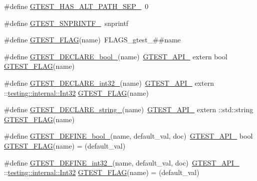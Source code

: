 \begin{DoxyCompactItemize}
\#define \hyperlink{fused-src_2gtest_2gtest_8h_acf0ee1851e6d342237bb64806ee1fd27}{G\-T\-E\-S\-T\-\_\-\-H\-A\-S\-\_\-\-A\-L\-T\-\_\-\-P\-A\-T\-H\-\_\-\-S\-E\-P\-\_\-}~0
\item 
\#define \hyperlink{fused-src_2gtest_2gtest_8h_aed1cc8143222d7a845a1269448ec203e}{G\-T\-E\-S\-T\-\_\-\-S\-N\-P\-R\-I\-N\-T\-F\-\_\-}~snprintf
\item 
\#define \hyperlink{fused-src_2gtest_2gtest_8h_a828f4e34a1c4b510da50ec1563e3562a}{G\-T\-E\-S\-T\-\_\-\-F\-L\-A\-G}(name)~F\-L\-A\-G\-S\-\_\-gtest\-\_\-\#\#name
\item 
\#define \hyperlink{fused-src_2gtest_2gtest_8h_a14eb0e9c6e0df765d1fbfd2db6966d14}{G\-T\-E\-S\-T\-\_\-\-D\-E\-C\-L\-A\-R\-E\-\_\-bool\-\_\-}(name)~\hyperlink{gtest-port_8h_aa73be6f0ba4a7456180a94904ce17790}{G\-T\-E\-S\-T\-\_\-\-A\-P\-I\-\_\-} extern bool \hyperlink{gtest__output__test___8cc_a448e05d56107d7550bea141e0f7a73d3}{G\-T\-E\-S\-T\-\_\-\-F\-L\-A\-G}(name)
\item 
\#define \hyperlink{fused-src_2gtest_2gtest_8h_aab2ee98cb616054b1d3a7dc71efe81fc}{G\-T\-E\-S\-T\-\_\-\-D\-E\-C\-L\-A\-R\-E\-\_\-int32\-\_\-}(name)~\hyperlink{gtest-port_8h_aa73be6f0ba4a7456180a94904ce17790}{G\-T\-E\-S\-T\-\_\-\-A\-P\-I\-\_\-} extern \-::\hyperlink{namespacetesting_1_1internal_af89e21e4043b5cf0c120af487b24fa06}{testing\-::internal\-::\-Int32} \hyperlink{gtest__output__test___8cc_a448e05d56107d7550bea141e0f7a73d3}{G\-T\-E\-S\-T\-\_\-\-F\-L\-A\-G}(name)
\item 
\#define \hyperlink{fused-src_2gtest_2gtest_8h_a9f74eee05f7ee5534139a622fe7da7dd}{G\-T\-E\-S\-T\-\_\-\-D\-E\-C\-L\-A\-R\-E\-\_\-string\-\_\-}(name)~\hyperlink{gtest-port_8h_aa73be6f0ba4a7456180a94904ce17790}{G\-T\-E\-S\-T\-\_\-\-A\-P\-I\-\_\-} extern \-::std\-::string \hyperlink{gtest__output__test___8cc_a448e05d56107d7550bea141e0f7a73d3}{G\-T\-E\-S\-T\-\_\-\-F\-L\-A\-G}(name)
\item 
\#define \hyperlink{fused-src_2gtest_2gtest_8h_a48e05814779e5a2f432b06a12618a760}{G\-T\-E\-S\-T\-\_\-\-D\-E\-F\-I\-N\-E\-\_\-bool\-\_\-}(name, default\-\_\-val, doc)~\hyperlink{gtest-port_8h_aa73be6f0ba4a7456180a94904ce17790}{G\-T\-E\-S\-T\-\_\-\-A\-P\-I\-\_\-} bool \hyperlink{gtest__output__test___8cc_a448e05d56107d7550bea141e0f7a73d3}{G\-T\-E\-S\-T\-\_\-\-F\-L\-A\-G}(name) = (default\-\_\-val)
\item 
\#define \hyperlink{fused-src_2gtest_2gtest_8h_a88ee2f19589ffff86ca742fd33611358}{G\-T\-E\-S\-T\-\_\-\-D\-E\-F\-I\-N\-E\-\_\-int32\-\_\-}(name, default\-\_\-val, doc)~\hyperlink{gtest-port_8h_aa73be6f0ba4a7456180a94904ce17790}{G\-T\-E\-S\-T\-\_\-\-A\-P\-I\-\_\-} \-::\hyperlink{namespacetesting_1_1internal_af89e21e4043b5cf0c120af487b24fa06}{testing\-::internal\-::\-Int32} \hyperlink{gtest__output__test___8cc_a448e05d56107d7550bea141e0f7a73d3}{G\-T\-E\-S\-T\-\_\-\-F\-L\-A\-G}(name) = (default\-\_\-val)

\end{DoxyCompactItemize}
